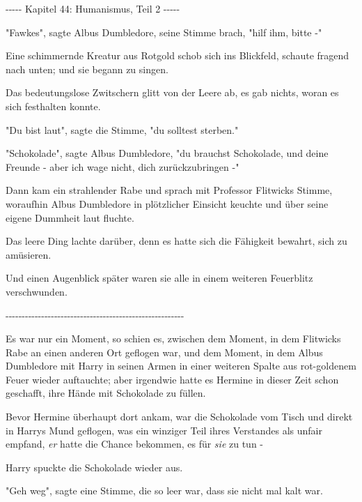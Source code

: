 

\hypertarget{humanismus-teil-2}{%

-\/-\/-\/-\/- Kapitel 44: Humanismus, Teil 2 -\/-\/-\/-\/-

"Fawkes", sagte Albus Dumbledore, seine Stimme brach, "hilf ihm, bitte -"

Eine schimmernde Kreatur aus Rotgold schob sich ins Blickfeld, schaute fragend nach unten; und sie begann zu singen.

Das bedeutungslose Zwitschern glitt von der Leere ab, es gab nichts, woran es sich festhalten konnte.

"Du bist laut", sagte die Stimme, "du solltest sterben."

"Schokolade", sagte Albus Dumbledore, "du brauchst Schokolade, und deine Freunde - aber ich wage nicht, dich zurückzubringen -"

Dann kam ein strahlender Rabe und sprach mit Professor Flitwicks Stimme, woraufhin Albus Dumbledore in plötzlicher Einsicht keuchte und über seine eigene Dummheit laut fluchte.

Das leere Ding lachte darüber, denn es hatte sich die Fähigkeit bewahrt, sich zu amüsieren.

Und einen Augenblick später waren sie alle in einem weiteren Feuerblitz verschwunden.

-\/-\/-\/-\/-\/-\/-\/-\/-\/-\/-\/-\/-\/-\/-\/-\/-\/-\/-\/-\/-\/-\/-\/-\/-\/-\/-\/-\/-\/-\/-\/-\/-\/-\/-\/-\/-\/-\/-\/-\/-\/-\/-\/-\/-\/-\/-\/-\/-\/-\/-\/-\/-\/-\/-

Es war nur ein Moment, so schien es, zwischen dem Moment, in dem Flitwicks Rabe an einen anderen Ort geflogen war, und dem Moment, in dem Albus Dumbledore mit Harry in seinen Armen in einer weiteren Spalte aus rot-goldenem Feuer wieder auftauchte; aber irgendwie hatte es Hermine in dieser Zeit schon geschafft, ihre Hände mit Schokolade zu füllen.

Bevor Hermine überhaupt dort ankam, war die Schokolade vom Tisch und direkt in Harrys Mund geflogen, was ein winziger Teil ihres Verstandes als unfair empfand, \emph{er} hatte die Chance bekommen, es für \emph{sie} zu tun -

Harry spuckte die Schokolade wieder aus.

"Geh weg", sagte eine Stimme, die so leer war, dass sie nicht mal kalt war.

}

